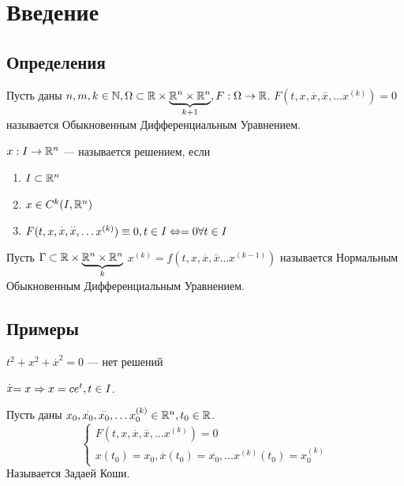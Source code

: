 

\section{Введение}
\subsection{Определения}
\begin{definition}
    Пусть даны \(n, m, k \in \mathbb{N}, \Omega \subset \mathbb{R} \times \underbrace{\mathbb{R}^n \times \mathbb{R}^n}_{k + 1}, F: \Omega \rightarrow \mathbb{R}\). \(F(t, x, \stackrel{.}{x}, \stackrel{..}{x}, \dots x^{(k)}) = 0\) называется Обыкновенным Дифференциальным Уравнением.
\end{definition}

\begin{definition}
    \(x: I \rightarrow \mathbb{R}^n\) --- называется решением, если
    \begin{enumerate}
        \item \(I \subset \mathbb{R}^n\)
        \item \(x \in C^k(I, \mathbb{R}^n)\)
        \item \(F(t, x, \stackrel{.}{x}, \stackrel{..}{x}, \dots x^{(k)}) \equiv 0, t \in I \Leftrightarrow = 0 \forall t \in I 
        \)
    \end{enumerate}
\end{definition}

\begin{definition}
    Пусть \(\Gamma \subset \mathbb{R} \times \underbrace{\mathbb{R}^n \times \mathbb{R}^n}_{k}\)
    \(x^{(k)} = f(t, x, \stackrel{.}{x}, \stackrel{..}{x} \dots x^{(k - 1)})\) называется Нормальным Обыкновенным Дифференциальным Уравнением.
\end{definition}

\subsection{Примеры}
\begin{example}
    \(t^2 + x^2 + \stackrel{.}{x}^2 = 0\) --- нет решений
\end{example}

\begin{example}
    \(\stackrel{.}{x} = x \Rightarrow x = ce^t, t \in I\).
\end{example}

\begin{definition}
    Пусть даны \(x_0, \stackrel{.}{x_0}, \stackrel{..}{x_0}, \dots x_0^{(k)} \in \mathbb{R}^n, t_0 \in \mathbb{R}\).
    \begin{equation}
        \begin{cases}
            F(t, x, \stackrel{.}{x}, \stackrel{..}{x}, \dots x^{(k)}) = 0\\
            x(t_0) = x_0,  \stackrel{.}{x}(t_0) = \stackrel{.}{x_0}, \dots x^{(k)}(t_0) = x_0^{(k)}    
        \end{cases}
    \end{equation}
    Называется Задаей Коши.
\end{definition}

